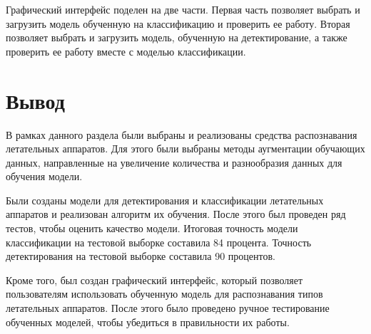 Графический интерфейс поделен на две части. Первая часть позволяет выбрать и загрузить модель обученную на классификацию и проверить ее работу. Вторая позволяет выбрать и загрузить модель, обученную на детектирование, а также проверить ее работу вместе с моделью классификации.

\section{Вывод}

В рамках данного раздела были выбраны и реализованы средства распознавания летательных аппаратов. Для этого были выбраны методы аугментации обучающих данных, направленные на увеличение количества и разнообразия данных для обучения модели. 

Были созданы модели для детектирования и классификации летательных аппаратов и реализован алгоритм их обучения. После этого был проведен ряд тестов, чтобы оценить качество модели. Итоговая точность модели классификации на тестовой выборке составила 84 процента. Точность детектирования на тестовой выборке составила 90 процентов.

Кроме того, был создан графический интерфейс, который позволяет пользователям использовать обученную модель для распознавания типов летательных аппаратов. После этого было проведено ручное тестирование обученных моделей, чтобы убедиться в правильности их работы.